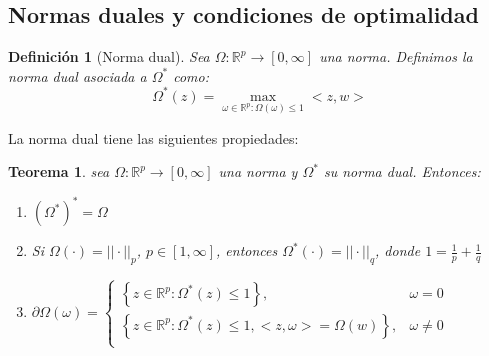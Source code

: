 \documentclass[12pt,draftcls, onecolumn, letterpaper,compsoc]{IEEEtran}
\newtheorem{definition}{\textbf{Definici\'{o}n}}
\newtheorem{theorem}{\textbf{Teorema}}
\begin{document}
\subsection{Normas duales y condiciones de optimalidad}

\begin{definition}[Norma dual]
    Sea $\Omega:\mathbb{R}^{p} \rightarrow [0, \infty]$ una norma. Definimos la norma dual asociada a $\Omega^{*}$ como:
    \begin{displaymath}
        \Omega^{*}(z) = \max_{\omega \in {\mathbb{R}^{p}}: \Omega(\omega)\leq 1} <z,w>
    \end{displaymath}
\end{definition}

La norma dual tiene las siguientes propiedades:
\begin{theorem}\label{thm:normProperties}
    sea $\Omega:\mathbb{R}^{p} \rightarrow [0, \infty]$ una norma y $\Omega^{*}$ su norma dual. Entonces:\\
    \begin{enumerate}
        \item{$(\Omega^{*})^{*} = \Omega$}
        \item{Si $\Omega(\cdot) = ||\cdot||_p$, $p\in [1, \infty]$, entonces $\Omega^{*}(\cdot) = ||\cdot||_{q}$, donde $1=\frac{1}{p} + \frac{1}{q}$}
        \item{$\partial \Omega(\omega) = \left\lbrace\begin{array}{ll}
                \left\lbrace z\in \mathbb{R}^{p}: \Omega^{*}(z)\leq 1\right\rbrace,  &   \omega=0\\
                \left\lbrace z\in \mathbb{R}^{p}: \Omega^{*}(z)\leq 1, <z,\omega> = \Omega(w)\right\rbrace,  &   \omega\neq0\\
            \end{array}\right.
        $}
    \end{enumerate}
\end{theorem}
\end{document}
